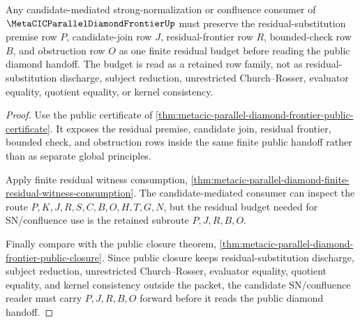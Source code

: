 \begin{theorem}
\label{thm:metacic-parallel-diamond-frontier-candidate-sn-residual-budget}
Any candidate-mediated strong-normalization or confluence consumer of $\MetaCICParallelDiamondFrontierUp$ must preserve the residual-substitution premise row $P$, candidate-join row $J$, residual-frontier row $R$, bounded-check row $B$, and obstruction row $O$ as one finite residual budget before reading the public diamond handoff. The budget is read as a retained row family, not as residual-substitution discharge, subject reduction, unrestricted Church--Rosser, evaluator equality, quotient equality, or kernel consistency.
\end{theorem}
\begin{proof}
Use the public certificate of \autoref{thm:metacic-parallel-diamond-frontier-public-certificate}. It exposes the residual premise, candidate join, residual frontier, bounded check, and obstruction rows inside the same finite public handoff rather than as separate global principles.

Apply finite residual witness consumption, \autoref{thm:metacic-parallel-diamond-finite-residual-witness-consumption}. The candidate-mediated consumer can inspect the route $P,K,J,R,S,C,B,O,H,T,G,N$, but the residual budget needed for SN/confluence use is the retained subroute $P,J,R,B,O$.

Finally compare with the public closure theorem, \autoref{thm:metacic-parallel-diamond-frontier-public-closure}. Since public closure keeps residual-substitution discharge, subject reduction, unrestricted Church--Rosser, evaluator equality, quotient equality, and kernel consistency outside the packet, the candidate SN/confluence reader must carry $P,J,R,B,O$ forward before it reads the public diamond handoff.
\end{proof}

